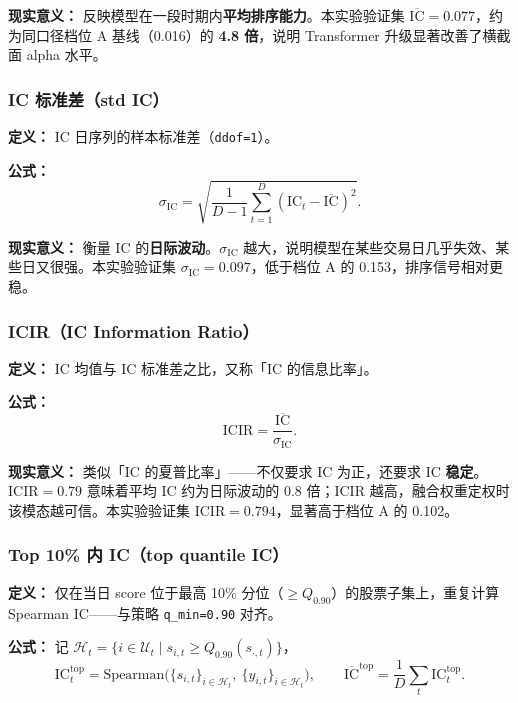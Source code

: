 \documentclass[UTF8,a4paper,12pt]{ctexart}
\begin{document}
\textbf{现实意义：} 反映模型在一段时期内\textbf{平均排序能力}。本实验验证集 $\overline{\mathrm{IC}}=0.077$，约为同口径档位 A 基线（0.016）的 \textbf{4.8 倍}，说明 Transformer 升级显著改善了横截面 alpha 水平。

\subsubsection{IC 标准差（std IC）}

\textbf{定义：} IC 日序列的样本标准差（\texttt{ddof=1}）。

\textbf{公式：}
\begin{equation}
  \sigma_{\mathrm{IC}} = \sqrt{\frac{1}{D-1}\sum_{t=1}^{D}(\mathrm{IC}_t-\overline{\mathrm{IC}})^2}.
\end{equation}

\textbf{现实意义：} 衡量 IC 的\textbf{日际波动}。$\sigma_{\mathrm{IC}}$ 越大，说明模型在某些交易日几乎失效、某些日又很强。本实验验证集 $\sigma_{\mathrm{IC}}=0.097$，低于档位 A 的 0.153，排序信号相对更稳。

\subsubsection{ICIR（IC Information Ratio）}

\textbf{定义：} IC 均值与 IC 标准差之比，又称「IC 的信息比率」。

\textbf{公式：}
\begin{equation}
  \mathrm{ICIR} = \frac{\overline{\mathrm{IC}}}{\sigma_{\mathrm{IC}}}.
\end{equation}

\textbf{现实意义：} 类似「IC 的夏普比率」——不仅要求 IC 为正，还要求 IC \textbf{稳定}。ICIR$=0.79$ 意味着平均 IC 约为日际波动的 0.8 倍；ICIR 越高，融合权重定权时该模态越可信。本实验验证集 ICIR$=0.794$，显著高于档位 A 的 0.102。

\subsubsection{Top 10\% 内 IC（top quantile IC）}

\textbf{定义：} 仅在当日 score 位于最高 10\% 分位（$\ge Q_{0.90}$）的股票子集上，重复计算 Spearman IC——与策略 \texttt{q\_min=0.90} 对齐。

\textbf{公式：} 记 $\mathcal H_t=\{i\in\mathcal U_t \mid s_{i,t}\ge Q_{0.90}(s_{\cdot,t})\}$，
\begin{equation}
  \mathrm{IC}_t^{\mathrm{top}}
  = \mathrm{Spearman}\big(\{s_{i,t}\}_{i\in\mathcal H_t},\ \{y_{i,t}\}_{i\in\mathcal H_t}\big),
  \qquad
  \overline{\mathrm{IC}}^{\mathrm{top}} = \frac{1}{D}\sum_t \mathrm{IC}_t^{\mathrm{top}}.
\end{equation}
\end{document}
